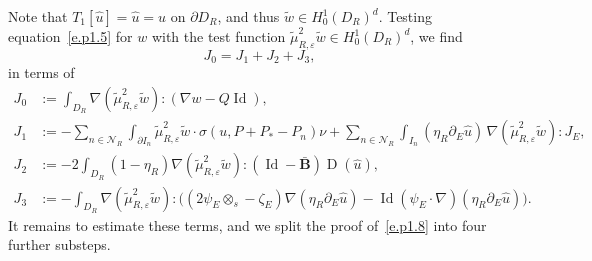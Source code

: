 \documentclass[JEP,XML,SOM,Unicode,published]{cedram}
\let\mathcal\mathscr
\theoremstyle{plain}
\theoremstyle{definition}
\newcommand{\e}{\varepsilon}
\newcommand{\Nc}{\mathcal N}
\newcommand{\Id}{\operatorname{Id}}
\newcommand{\D}{\operatorname{D}}
\newcommand{\Bb}{\bar{\boldsymbol B}}
\begin{document}
Note that $T_1[\hat u]=\hat u=u$ on $\partial D_R$, and thus $\tilde w\in H^1_0(D_R)^d$.
Testing equation~\eqref{e.p1.5} for $w$ with the test function $\tilde\mu_{R,\e}^2\tilde w\in H^1_0(D_R)^d$, we find
\begin{equation}\label{eq:J0123}
J_0=J_1+J_2+J_3,
\end{equation}
in terms of
\begin{align*}
J_0 &:= \int_{D_R}\nabla(\tilde\mu_{R,\e}^2\tilde w):(\nabla w- Q\Id),\\
J_1&:= -\sum_{n\in\Nc_R}\int_{\partial I_n}\tilde\mu_{R,\e}^2\tilde w\cdot\sigma(u,P+P_*-P_n)\nu+\sum_{n\in\Nc_R}\int_{I_n}(\eta_R\partial_E\hat u)\,\nabla(\tilde\mu_{R,\e}^2\tilde w):J_E,\\
J_2&:= -2\int_{D_R}(1-\eta_R)\nabla(\tilde\mu_{R,\e}^2\tilde w):(\Id-\Bb)\D(\hat u),\\
J_3&:= -\int_{D_R}\nabla(\tilde\mu_{R,\e}^2\tilde w):\Big((2\psi_E\otimes_s-\zeta_E)\nabla(\eta_R\partial_E\hat u)-\Id(\psi_E\cdot\nabla)(\eta_R\partial_E\hat u)\Big).
\end{align*}
It remains to estimate these terms, and we split the proof of~\eqref{e.p1.8} into four further substeps.
\end{document}
